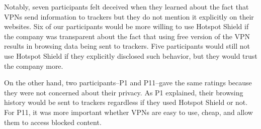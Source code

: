 Notably, seven participants felt deceived when they learned about the fact that
VPNs send information to trackers but they do not mention it explicitly on
their websites. Six of our participants would be more willing to use Hotspot Shield
if the company was transparent about the fact that using free version of the VPN
results in browsing data being sent to trackers.  Five participants would still not use Hotspot Shield if they explicitly disclosed such behavior, but they would trust the company more.

On the other hand, two participants--P1 and P11--gave the same ratings because they were not concerned about their privacy. As P1 explained, their browsing history would be sent to trackers regardless if they used Hotspot Shield or not.
For P11, it was more important whether VPNs are easy to use, cheap, and allow
them to access blocked content. 



% 


